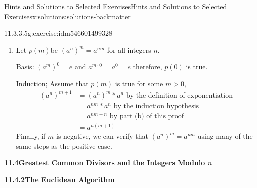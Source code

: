 \documentclass[oneside,10pt,]{book}
\newcommand{\blocktitlefont}{\relax}
\numberwithin{equation}{section}
\begin{document}
\begin{solutions-chapter}{Hints and Solutions to Selected Exercises}{}{Hints and Solutions to Selected Exercises}{}{}{x:solutions:solutions-backmatter}
\begin{divisionsolution}{11.3.3.5}{}{g:exercise:idm546601499328}
\begin{enumerate}[label=(\alph*)]
\begin{equation*}
\begin{split}
a^{n+(m+1)}&= a^{(n+m)+1}\textrm{      by the associativity of integer addition}\\
&=a^{n+m}*a^1\textrm{    by the definition of exponentiation}\\
&=\left(a^n*a^m\right)*a^1 \textrm{     by the induction hypothesis}\\
&= a^n*\left(a^m*a^1\right)\textrm{     by associativity}\\
&= a^n*a^{m+1}\textrm{    by the definition of exponentiation}
\end{split}
\end{equation*}
To complete the proof, you need to consider the cases where \(m\) and\slash{}or \(n\) are negative.%
\item{}Let \(p(m)\)be \(\left(a^n\right)^m= a^{n m}\) for all integers \(n\).%
\par
Basis: \(\left(a^m\right)^0= e\) and \(a^{m\cdot 0}=a^0= e\) therefore, \(p(0)\) is true.%
\par
Induction; Assume that \(p(m)\) is true for some \(m >\)0,%
\begin{equation*}
\begin{split}
\left(a^n\right)^{m+1}&=\left(a^n\right)^m*a^n \textrm{     by the definition of exponentiation}\\
&=a^{n m}*a^n\textrm{      by the induction hypothesis}\\
& =a^{n m + n}\textrm{      by part (b)  of this proof}\\
& =a^{n(m+1)}
\end{split}
\end{equation*}
Finally, if \(m\) is negative, we can verify that \(\left(a^n\right)^m= a^{n m}\) using many of the same steps as the positive case.%
\end{enumerate}
%
\end{divisionsolution}%
\par\smallskip
\noindent\textbf{\Large{}11.4\space\textperiodcentered\space{}Greatest Common Divisors  and the Integers Modulo \(n\)}
\par\smallskip
\par\smallskip
\noindent\textbf{\Large{}11.4.2\space\textperiodcentered\space{}The Euclidean Algorithm}
\par\smallskip
{}
\end{solutions-chapter}
\end{document}
